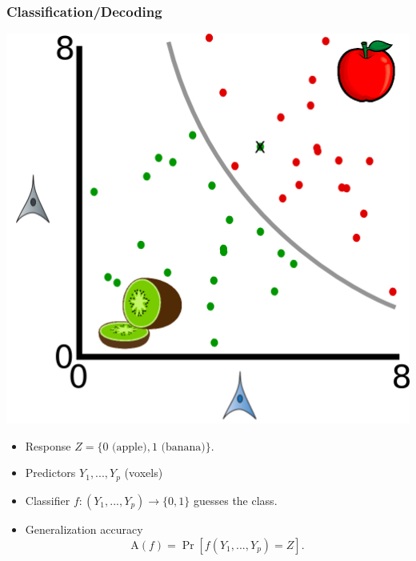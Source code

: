 \documentclass{beamer}
\begin{document}
\begin{frame}
\frametitle{Classification/Decoding}
\begin{center}
\includegraphics[scale = 0.3]{intro4.png}
\end{center}
\begin{itemize}
\item Response $Z = \{0 \text{ (apple)}, 1 \text{ (banana)}\}$.
\item Predictors $Y_1,..., Y_p$ (voxels)
\item Classifier $f: (Y_1,...,Y_p) \to \{0, 1\}$ guesses the class.
\item Generalization accuracy
\[
\text{A}(f) = \Pr[f(Y_1,...,Y_p) = Z].
\]
\end{itemize}
\end{frame}
\end{document}
